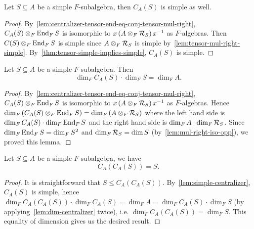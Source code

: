  \begin{lemma}\label{lem:simple-centralizer}
   Let $S\subseteq A$ be a simple $F$-subalgebra, then
   $C_{A}(S)$ is simple as well.
   \leanok
 \end{lemma}

 \begin{proof}
   By~\cref{lem:centralizer-tensor-end-eq-conj-tensor-mul-right},
   $C_{A}(S) \otimes_{F}\operatorname{End}_{F}S$ is isomorphic to
   $x\left(A\otimes_{F}\mathcal{R}_{S}\right)x^{-1}$ as $F$-algebras. Then
   $C(S)\otimes_{F}\operatorname{End}_{F}S$ is simple since $A\otimes_{F}\mathcal{R}_{S}$ is simple
   by~\cref{lem:tensor-mul-right-simple}.
   By~\cref{thm:tensor-simple-implies-simple}, $C_{A}(S)$ is simple.
 \end{proof}

 \begin{lemma}
   \label{lem:dim-centralizer}
   Let $S\subseteq A$ be a simple $F$-subalgebra. Then
   \[
     \dim_{F}C_{A}(S)\cdot\dim_{F}S=\dim_{F}A.
   \]
   \leanok
 \end{lemma}
 \begin{proof}
   By~\cref{lem:centralizer-tensor-end-eq-conj-tensor-mul-right},
   $C_{A}(S) \otimes_{F}\operatorname{End}_{F}S$ is isomorphic to
   $x\left(A\otimes_{F}\mathcal{R}_{S}\right)x^{-1}$ as $F$-algebras. Hence $\dim_{F}\left(C_{A}(S)\otimes_{F}\operatorname{End}_{F}S\right)=\dim_{F}\left(A\otimes_{F}\mathcal{R}_{S}\right)$ where the left hand side is $\dim_{F}C_{A}(S)\cdot \dim_{F}\operatorname{End}_{F}S$ and the right hand side is $\dim_{F}A\cdot\dim_{F}\mathcal{R}_{S}$. Since $\dim_{F}\operatorname{End}_{F}S=\dim_{F}S^{2}$ and $\dim_{F}\mathcal{R}_{S}=\dim S$ (by~\cref{lem:mul-right-iso-opp}), we proved this lemma.
 \end{proof}

 \begin{theorem}\label{thm:double-centralizer}
   Let $S\subseteq A$ be a simple $F$-subalgebra, we have
   \[
     C_{A}\left(C_{A}(S)\right) = S.
   \]
 \end{theorem}
 \begin{proof}
  It is straightforward that $S \le C_{A}\left(C_{A}(S)\right)$. By~\cref{lem:simple-centralizer}, $C_{A}(S)$ is simple, hence $\dim_{F}C_{A}\left(C_{A}(S)\right)\cdot \dim_{F}C_{A}(S)=\dim_{F}A=\dim_{F}C_{A}(S)\cdot \dim_{F}S$ (by applying~\cref{lem:dim-centralizer} twice), i.e. $\dim_{F}C_{A}\left(C_{A}(S)\right) = \dim_{F}S$. This equality of dimension gives us the desired result.
 \end{proof}
 
